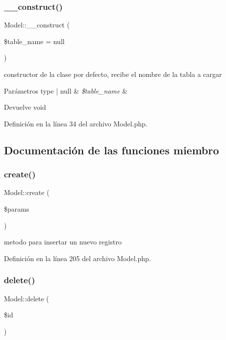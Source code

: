 \subsubsection{\texorpdfstring{\_\_construct()}{\_\_construct()}}
{\footnotesize\ttfamily Model\+::\+\_\+\+\_\+construct (\begin{DoxyParamCaption}\item[{}]{\$table\+\_\+name = {\ttfamily null} }\end{DoxyParamCaption})}

constructor de la clase por defecto, recibe el nombre de la tabla a cargar


\begin{DoxyParams}[1]{Parámetros}
type | null & {\em \$table\+\_\+name} & \\
\hline
\end{DoxyParams}
\begin{DoxyReturn}{Devuelve}
void 
\end{DoxyReturn}


Definición en la línea 34 del archivo Model.\+php.



\subsection{Documentación de las funciones miembro}
\mbox{\label{class_model_ab85f7264cd89a8180cacda746a089e9e}} 
\subsubsection{\texorpdfstring{create()}{create()}}
{\footnotesize\ttfamily Model\+::create (\begin{DoxyParamCaption}\item[{}]{\$params }\end{DoxyParamCaption})}

metodo para insertar un nuevo registro 

Definición en la línea 205 del archivo Model.\+php.

\mbox{\label{class_model_ae045fb57af57685c24f2dbe5fbd7f684}} 
\subsubsection{\texorpdfstring{delete()}{delete()}}
{\footnotesize\ttfamily Model\+::delete (\begin{DoxyParamCaption}\item[{}]{\$id }\end{DoxyParamCaption})}

